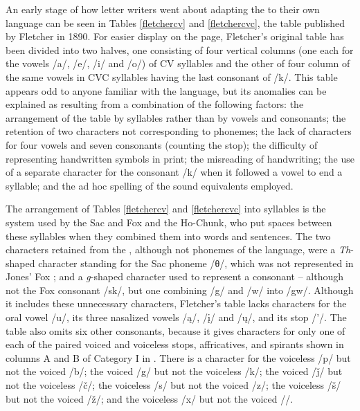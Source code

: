 \documentclass[output=paper]{LSP/langsci}
\begin{document}
An early stage of how  letter writers went about adapting the   to their own language can be seen in Tables \ref{fletchercv} and \ref{fletchercvc}, the   table published by Fletcher in 1890. For easier display on the page, Fletcher's original table has been divided into two halves, one consisting of four vertical columns (one each for the vowels /a/, /e/, /i/ and /o/) of CV syllables and the other of four column of the same vowels in CVC syllables having the last consonant of /k/. This table appears odd to anyone familiar with the  language, but its anomalies can be explained as resulting from a combination of the following factors: the arrangement of the table by syllables rather than by vowels and consonants; the retention of two   characters not corresponding to  phonemes; the lack of  characters for four  vowels and seven  consonants (counting the  stop); the difficulty of  representing handwritten symbols in print; the misreading of handwriting; the use of a separate character for the consonant /k/ when it followed a vowel to end a syllable; and the ad hoc spelling of the  sound equivalents employed.

The arrangement of Tables \ref{fletchercv} and \ref{fletchercvc} into syllables is the system used by the Sac and Fox and the Ho-Chunk, who put spaces between these syllables when they combined them into words and sentences. The two characters retained from the  , although not phonemes of the  language, were a \emph{Th}-shaped  character standing for the Sac phoneme /θ/, which was not represented in Jones' Fox ; and a \emph{g}-shaped character used to represent a consonant  -- although not the Fox consonant  /sk/, but one combining /g/ and /w/ into /gw/. Although it includes these unnecessary characters, Fletcher's table lacks characters for the  oral vowel /u/, its three nasalized vowels /\k{a}/, /\k{i}/ and /\k{u}/, and its  stop /'/. The table also omits six other  consonants, because it gives  characters for only one of each of the paired voiced and voiceless stops, affricatives, and spirants shown in columns A and B of Category I in . There is a character for the voiceless /p/ but not the voiced /b/; the voiced /g/ but not the voiceless /k/; the voiced /ǰ/ but not the voiceless /\v{c}/; the voiceless /s/ but not the voiced /z/; the voiceless /\v{s}/ but not the voiced /\v{z}/; and the voiceless /x/ but not the voiced //. 
\end{document}
